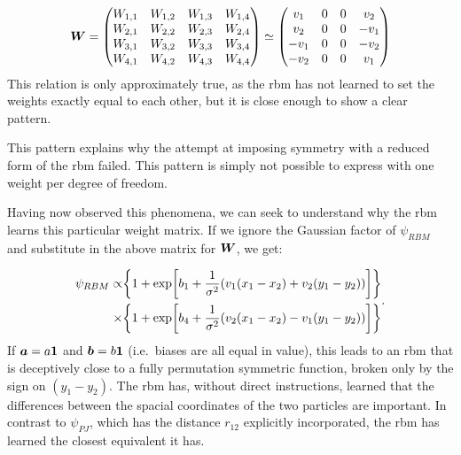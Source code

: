 \documentclass[Thesis.tex]{subfiles}
\begin{document}
\begin{align}
  \mat W = \mqty(
                    W_{1,1} & W_{1,2} & W_{1,3} & W_{1,4}\\
                    W_{2,1} & W_{2,2} & W_{2,3} & W_{2,4}\\
                    W_{3,1} & W_{3,2} & W_{3,3} & W_{3,4}\\
                    W_{4,1} & W_{4,2} & W_{4,3} & W_{4,4}
                )
                                                  \simeq \mqty(
                                                   v_1 & 0 & 0 &  v_2\\
                                                   v_2 & 0 & 0 & -v_1\\
                                                  -v_1 & 0 & 0 & -v_2\\
                                                  -v_2 & 0 & 0 &  v_1
                                                  )
\end{align}
This relation is only approximately true, as the \gls{rbm} has not learned to set the
weights exactly equal to each other, but it is close enough to show a clear
pattern.

This pattern explains why the attempt at imposing symmetry with a reduced form
of the \gls{rbm} failed. This pattern is simply not possible to express with one
weight per degree of freedom.

Having now observed this phenomena, we can seek to understand why the \gls{rbm} learns
this particular weight matrix. If we ignore the Gaussian factor of $\psi_{RBM}$
and substitute in the above matrix for $\bm{W}$, we get:

\begin{align}
  \begin{split}
  \psi_{RBM} \propto &\qty{1 + \exp[b_1 + \frac{1}{\sigma^2}\qty(v_1(x_1-x_2) + v_2(y_1-y_2))]}\\
                   \times &\qty{1 + \exp[b_4 + \frac{1}{\sigma^2}\qty(v_2(x_1-x_2) - v_1(y_1-y_2))]}
  \end{split}.
\end{align}
If $\bm{a}=a\bm{1}$ and $\bm{b}=b\bm{1}$ (i.e.\ biases are all equal in value),
this leads to an \gls{rbm} that is deceptively close to a fully permutation symmetric
function, broken only by the sign on $(y_1-y_2)$. The \gls{rbm} has, without direct
instructions, learned that the differences between the spacial coordinates of
the two particles are important. In contrast to $\psi_{PJ}$, which has the
distance $r_{12}$ explicitly incorporated, the \gls{rbm} has learned the closest
equivalent it has.
\end{document}
